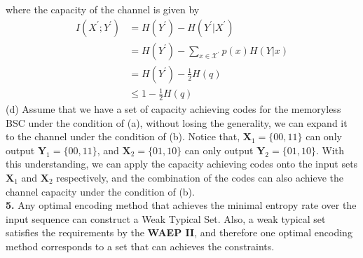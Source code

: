 \documentclass[12pt]{article}
\begin{document}
	where the capacity of the channel is given by 
	\begin{align*}
		I(X^\prime;Y^\prime) &= H(Y^\prime) - H(Y^\prime|X^\prime) \\
							 &= H(Y^\prime) - \sum_{x\in\mathcal{X}^\prime}p(x)H(Y|x) \\
							 &= H(Y^\prime) - \frac{1}{2}H(q) \\
							 &\leq 1 - \frac{1}{2}H(q) 
	\end{align*}
	(d) Assume that we have a set of capacity achieving codes for the memoryless BSC under the condition of (a), without losing the generality, we can expand it to the channel under the condition of (b). Notice that, $ \mathbf{X}_1 = \{00, 11\} $ can only output $ \mathbf{Y}_1 = \{00, 11\} $, and $\mathbf{X}_2 = \{01, 10\}$ can only output $\mathbf{Y}_2 = \{01, 10\}$. With this understanding, we can apply the capacity achieving codes onto the input sets $\mathbf{X}_1$ and $ \mathbf{X}_2 $ respectively, and the combination of the codes can also achieve the channel capacity under the condition of (b). \\
	
	\textbf{5.} Any optimal encoding method that achieves the minimal entropy rate over the input sequence can construct a Weak Typical Set. Also, a weak typical set satisfies the requirements by the \textbf{WAEP II}, and therefore one optimal encoding method corresponds to a set that can achieves the constraints. 
\end{document}
